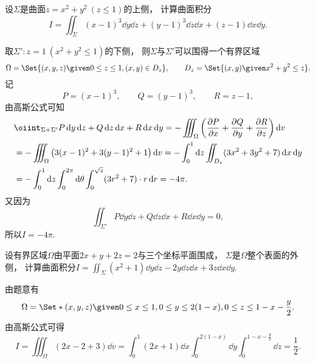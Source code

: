 \begin{example}
设\(\Sigma\)是曲面\(z=x^2+y^2\ (z\leq1)\)的上侧，
计算曲面积分\begin{equation*}
	I = \iint_\Sigma (x-1)^3 \dd{y}\dd{z} + (y-1)^3 \dd{z}\dd{x} + (z-1) \dd{x}\dd{y}.
\end{equation*}
\begin{solution}
取\(\Sigma': z=1\ (x^2+y^2\leq1)\)的下侧，
则\(\Sigma\)与\(\Sigma'\)可以围得一个有界区域\begin{equation*}
	\Omega = \Set{ (x,y,z) \given 0 \leq z \leq 1, (x,y) \in D_z },
	\qquad
	D_z = \Set{ (x,y) \given x^2+y^2 \leq z }.
\end{equation*}
记\begin{equation*}
	P = (x-1)^3,
	\qquad
	Q = (y-1)^3,
	\qquad
	R = z-1,
\end{equation*}
由高斯公式可知\begin{align*}
	&\oiint_{\Sigma+\Sigma'} P \dd{y}\dd{z} + Q \dd{z}\dd{x} + R \dd{x}\dd{y}
	= -\iiint_\Omega \left( \pdv{P}{x} + \pdv{Q}{y} + \pdv{R}{z} \right) \dd{v} \\
	&= -\iiint_\Omega \left( 3(x-1)^2 + 3(y-1)^2 + 1 \right) \dd{v}
	= -\int_0^1 \dd{z} \iint_{D_z} (3x^2+3y^2+7) \dd{x}\dd{y} \\
	&= -\int_0^1 \dd{z} \int_0^{2\pi} \dd{\theta}
	\int_0^{\sqrt{z}} (3r^2+7) \cdot r \dd{r}
	= -4\pi.
\end{align*}
又因为\begin{equation*}
	\iint_{\Sigma'} P \dd{y}\dd{z} + Q \dd{z}\dd{x} + R \dd{x}\dd{y}
	= 0,
\end{equation*}
所以\(I = -4\pi\).
\end{solution}
\end{example}
\begin{example}
设有界区域\(\Omega\)由平面\(2x+y+2z=2\)与三个坐标平面围成，
\(\Sigma\)是\(\Omega\)整个表面的外侧，
计算曲面积分\(I = \iint_\Sigma (x^2+1) \dd{y}\dd{z} - 2y \dd{z}\dd{x} + 3z \dd{x}\dd{y}\).
\begin{solution}
由题意有\begin{equation*}
	\Omega = \Set*{
		(x,y,z)
		\given
		0 \leq x \leq 1,
		0 \leq y \leq 2(1-x),
		0 \leq z \leq 1-x-\frac{y}2
	}.
\end{equation*}
由高斯公式可得\begin{equation*}
	I = \iiint_\Omega (2x-2+3) \dd{v}
	= \int_0^1 (2x+1) \dd{x}
	\int_0^{2(1-x)} \dd{y}
	\int_0^{1-x-\frac{y}2} \dd{z}
	= \frac12.
\end{equation*}
\end{solution}
\end{example}
